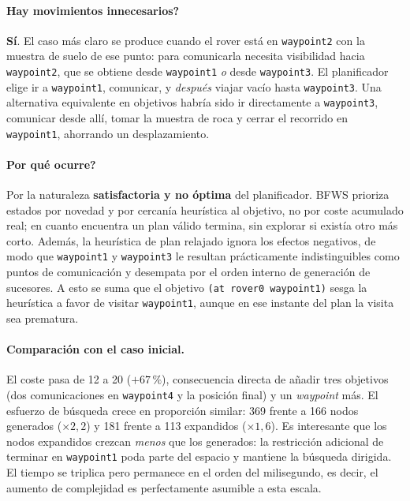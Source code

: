 \documentclass[12pt,a4paper]{article}
\begin{document}
\paragraph{\textquestiondown Hay movimientos innecesarios?}
\textbf{S\'i}. El caso m\'as claro se produce cuando el rover est\'a en
\texttt{waypoint2} con la muestra de suelo de ese punto: para comunicarla
necesita visibilidad hacia \texttt{waypoint2}, que se obtiene desde
\texttt{waypoint1} \emph{o} desde \texttt{waypoint3}. El planificador elige
ir a \texttt{waypoint1}, comunicar, y \emph{despu\'es} viajar vac\'io hasta
\texttt{waypoint3}. Una alternativa equivalente en objetivos habr\'ia sido ir
directamente a \texttt{waypoint3}, comunicar desde all\'i, tomar la muestra
de roca y cerrar el recorrido en \texttt{waypoint1}, ahorrando un
desplazamiento.

\paragraph{\textquestiondown Por qu\'e ocurre?}
Por la naturaleza \textbf{satisfactoria y no \'optima} del planificador. BFWS
prioriza estados por novedad y por cercan\'ia heur\'istica al objetivo, no por
coste acumulado real; en cuanto encuentra un plan v\'alido termina, sin
explorar si exist\'ia otro m\'as corto. Adem\'as, la heur\'istica de plan
relajado ignora los efectos negativos, de modo que \texttt{waypoint1} y
\texttt{waypoint3} le resultan pr\'acticamente indistinguibles como puntos de
comunicaci\'on y desempata por el orden interno de generaci\'on de sucesores.
A esto se suma que el objetivo \texttt{(at rover0 waypoint1)} sesga la
heur\'istica a favor de visitar \texttt{waypoint1}, aunque en ese instante
del plan la visita sea prematura.

\paragraph{Comparaci\'on con el caso inicial.}
El coste pasa de 12 a 20 ($+67\,\%$), consecuencia directa de a\~nadir tres
objetivos (dos comunicaciones en \texttt{waypoint4} y la posici\'on final) y
un \emph{waypoint} m\'as. El esfuerzo de b\'usqueda crece en proporci\'on
similar: 369 frente a 166 nodos generados ($\times2{,}2$) y 181 frente a 113
expandidos ($\times1{,}6$). Es interesante que los nodos expandidos crezcan
\emph{menos} que los generados: la restricci\'on adicional de terminar en
\texttt{waypoint1} poda parte del espacio y mantiene la b\'usqueda dirigida.
El tiempo se triplica pero permanece en el orden del milisegundo, es decir,
el aumento de complejidad es perfectamente asumible a esta escala.
\end{document}
